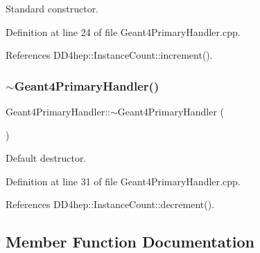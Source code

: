 Standard constructor. 



Definition at line 24 of file Geant4\+Primary\+Handler.\+cpp.



References D\+D4hep\+::\+Instance\+Count\+::increment().

\hypertarget{class_d_d4hep_1_1_simulation_1_1_geant4_primary_handler_aa559ec3b18b6663b07914aba80760212}{}\label{class_d_d4hep_1_1_simulation_1_1_geant4_primary_handler_aa559ec3b18b6663b07914aba80760212} 
\subsubsection{\texorpdfstring{$\sim$\+Geant4\+Primary\+Handler()}{~Geant4PrimaryHandler()}}
{\footnotesize\ttfamily Geant4\+Primary\+Handler\+::$\sim$\+Geant4\+Primary\+Handler (\begin{DoxyParamCaption}{ }\end{DoxyParamCaption})\hspace{0.3cm}{\ttfamily [virtual]}}



Default destructor. 



Definition at line 31 of file Geant4\+Primary\+Handler.\+cpp.



References D\+D4hep\+::\+Instance\+Count\+::decrement().



\subsection{Member Function Documentation}
\hypertarget{class_d_d4hep_1_1_simulation_1_1_geant4_primary_handler_a54370e4749de14a101a248981f51864b}{}\label{class_d_d4hep_1_1_simulation_1_1_geant4_primary_handler_a54370e4749de14a101a248981f51864b} 
